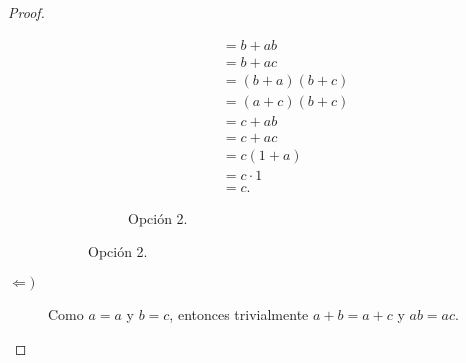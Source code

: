 \begin{ejercicio}
\begin{proof}
\begin{description}
\begin{figure}[H]
\begin{subfigure}[c]{0.4\linewidth}
\begin{align*}
                        &= b+ab\\
                        &= b+ac\\
                        &= (b+a)(b+c)\\
                        &= (a+c)(b+c)\\
                        &= c+ab\\
                        &= c+ac\\
                        &= c(1+a)\\
                        &= c\cdot 1\\
                        &= c.
                    \end{align*}
                    \caption{Opción 2.}
                \end{subfigure}
            \end{figure}

            \item[$\Longleftarrow)$]
            
            Como $a=a$ y $b=c$, entonces trivialmente $a+b=a+c$ y $ab=ac$.
        \end{description}
    \end{proof}
\end{ejercicio}



